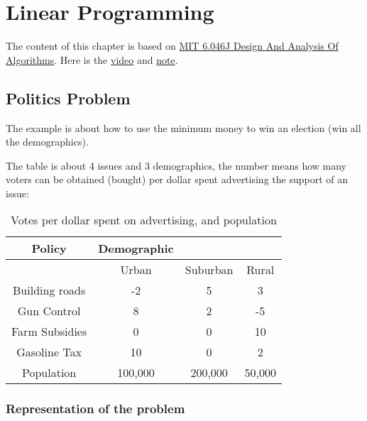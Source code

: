 \chapter{Linear Programming}

\begin{note}
    The content of this chapter is based on \href{https://ocw.mit.edu/courses/6-046j-design-and-analysis-of-algorithms-spring-2015/}{MIT 6.046J Design And Analysis Of Algorithms}.
    Here is the \href{https://www.youtube.com/watch?v=WwMz2fJwUCg}{video} and 
    \href{https://ocw.mit.edu/courses/6-046j-design-and-analysis-of-algorithms-spring-2015/resources/mit6_046js15_lec15/}{note}.
\end{note}

\section{Politics Problem}

\begin{example}
    The example is about how to use the minimum money to win an election (win all the demographics).

    The table is about 4 issues and 3 demographics, the number means how many voters can be obtained (bought) per dollar spent advertising the support of an issue:

    \begin{table}[H]
        \centering
        \begin{tabular}{c|c|c|c}
            \toprule
                Policy & Demographic   \\
            \midrule
                 & Urban & Suburban & Rural  \\
                Building roads & -2 & 5 & 3  \\
                Gun Control & 8 & 2 & -5  \\
                Farm Subsidies & 0 & 0 & 10  \\
                Gasoline Tax & 10 & 0 & 2  \\
                Population & 100,000 & 200,000 & 50,000  \\
            \bottomrule
        \end{tabular}
        \caption{Votes per dollar spent on advertising, and population}
        \label{tab:label}
    \end{table}
\end{example}

\subsection{Representation of the problem}

